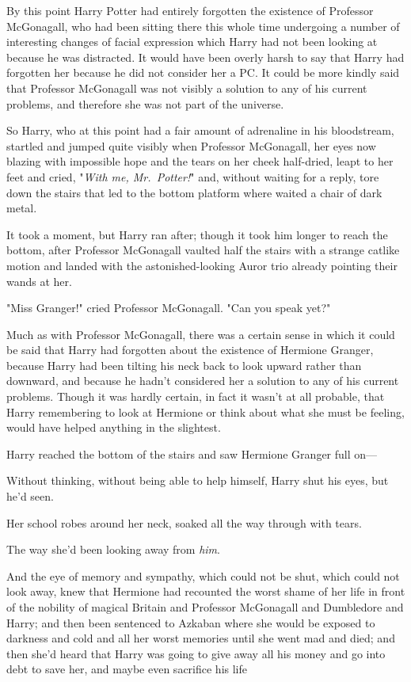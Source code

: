 By this point Harry Potter had entirely forgotten the existence of Professor
McGonagall, who had been sitting there this whole time undergoing a number of
interesting changes of facial expression which Harry had not been looking at
because he was distracted. It would have been overly harsh to say that Harry
had forgotten her because he did not consider her a PC. It could be more kindly
said that Professor McGonagall was not visibly a solution to any of his current
problems, and therefore she was not part of the universe.

So Harry, who at this point had a fair amount of adrenaline in his bloodstream,
startled and jumped quite visibly when Professor McGonagall, her eyes now
blazing with impossible hope and the tears on her cheek half-dried, leapt to
her feet and cried, "\emph{With me, Mr.~Potter!}" and, without waiting for a
reply, tore down the stairs that led to the bottom platform where waited a
chair of dark metal.

It took a moment, but Harry ran after; though it took him longer to reach the
bottom, after Professor McGonagall vaulted half the stairs with a strange
catlike motion and landed with the astonished-looking Auror trio already
pointing their wands at her.

"Miss Granger!" cried Professor McGonagall. "Can you speak yet?"

Much as with Professor McGonagall, there was a certain sense in which it could
be said that Harry had forgotten about the existence of Hermione Granger,
because Harry had been tilting his neck back to look upward rather than
downward, and because he hadn't considered her a solution to any of his current
problems. Though it was hardly certain, in fact it wasn't at all probable, that
Harry remembering to look at Hermione or think about what she must be feeling,
would have helped anything in the slightest.

Harry reached the bottom of the stairs and saw Hermione Granger full on---

Without thinking, without being able to help himself, Harry shut his eyes, but
he'd seen.

Her school robes around her neck, soaked all the way through with tears.

The way she'd been looking away from \emph{him}.

And the eye of memory and sympathy, which could not be shut, which could not
look away, knew that Hermione had recounted the worst shame of her life in
front of the nobility of magical Britain and Professor McGonagall and
Dumbledore and Harry; and then been sentenced to Azkaban where she would be
exposed to darkness and cold and all her worst memories until she went mad and
died; and then she'd heard that Harry was going to give away all his money and
go into debt to save her, and maybe even sacrifice his life

